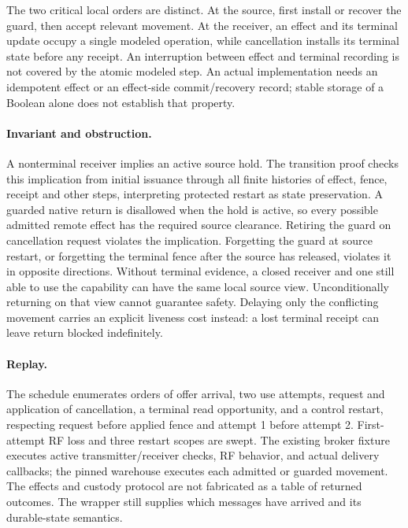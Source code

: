 \documentclass{article}
\begin{document}
The two critical local orders are distinct. At the source, first install
or recover the guard, then accept relevant movement. At the receiver,
an effect and its terminal update occupy a single modeled operation,
while cancellation installs its terminal state before any receipt. An
interruption between effect and terminal recording is not covered by the
atomic modeled step. An actual implementation needs an idempotent effect
or an effect-side commit/recovery record; stable storage of a Boolean alone
does not establish that property.

\paragraph{Invariant and obstruction.}
A nonterminal receiver implies an active source hold. The transition
proof checks this implication from initial issuance through all finite
histories of effect, fence, receipt and other steps, interpreting protected
restart as state preservation. A guarded native return is disallowed when
the hold is active, so every possible admitted remote effect has the
required source clearance. Retiring the guard on cancellation request
violates the implication. Forgetting the guard at source restart, or
forgetting the terminal fence after the source has released, violates it
in opposite directions. Without terminal evidence, a closed receiver and
one still able to use the capability can have the same local source view.
Unconditionally returning on that view cannot guarantee safety. Delaying
only the conflicting movement carries an explicit liveness cost instead:
a lost terminal receipt can leave return blocked indefinitely.

\paragraph{Replay.}
The schedule enumerates orders of offer arrival, two use attempts, request
and application of cancellation, a terminal read opportunity, and a
control restart, respecting request before applied fence and attempt 1
before attempt 2. First-attempt RF loss and three restart scopes are swept.
The existing broker fixture executes active transmitter/receiver checks,
RF behavior, and actual delivery callbacks; the pinned warehouse executes
each admitted or guarded movement. The effects and custody protocol are
not fabricated as a table of returned outcomes. The wrapper still supplies
which messages have arrived and its durable-state semantics.
\end{document}
